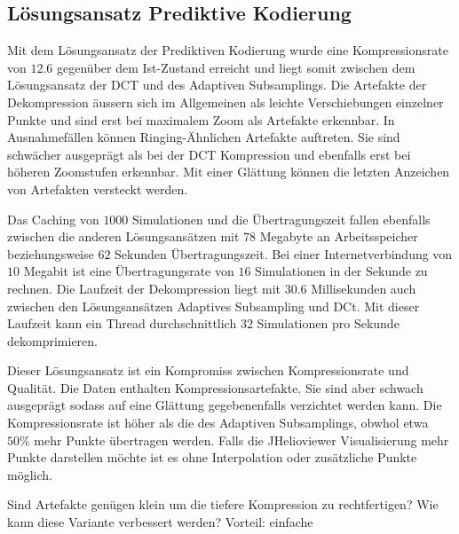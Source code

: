 \subsection{Lösungsansatz Prediktive Kodierung}
Mit dem Lösungsansatz der Prediktiven Kodierung wurde eine Kompressionsrate von $12.6$ gegenüber dem Ist-Zustand erreicht und liegt somit zwischen dem Lösungsansatz der DCT und des Adaptiven Subsamplings. Die Artefakte der Dekompression äussern sich im Allgemeinen als leichte Verschiebungen einzelner Punkte und sind erst bei maximalem Zoom als Artefakte erkennbar. In Ausnahmefällen können Ringing-Ähnlichen Artefakte auftreten. Sie sind schwächer ausgeprägt als bei der DCT Kompression und ebenfalls erst bei höheren Zoomstufen erkennbar. Mit einer Glättung können die letzten Anzeichen von Artefakten versteckt werden. 

Das Caching von $1000$ Simulationen und die Übertragungszeit fallen ebenfalls zwischen die anderen Lösungsansätzen mit $78$ Megabyte an Arbeitsspeicher beziehungsweise $62$ Sekunden Übertragungszeit. Bei einer Internetverbindung von $10$ Megabit ist eine Übertragungsrate von $16$ Simulationen in der Sekunde zu rechnen. Die Laufzeit der Dekompression liegt mit $30.6$ Millisekunden auch zwischen den Lösungsansätzen Adaptives Subsampling und DCt. Mit dieser Laufzeit kann ein Thread durchschnittlich $32$ Simulationen pro Sekunde dekomprimieren.

Dieser Lösungsansatz ist ein Kompromiss zwischen Kompressionsrate und Qualität. Die Daten enthalten Kompressionsartefakte. Sie sind aber schwach ausgeprägt sodass auf eine Glättung gegebenenfalls verzichtet werden kann. Die Kompressionsrate ist höher als die des Adaptiven Subsamplings, obwhol etwa $50\%$ mehr Punkte übertragen werden. Falls die JHelioviewer Visualisierung mehr Punkte darstellen möchte ist es ohne Interpolation oder zusätzliche Punkte möglich.

Sind Artefakte genügen klein um die tiefere Kompression zu rechtfertigen?  Wie kann diese Variante verbessert werden?
Vorteil: einfache